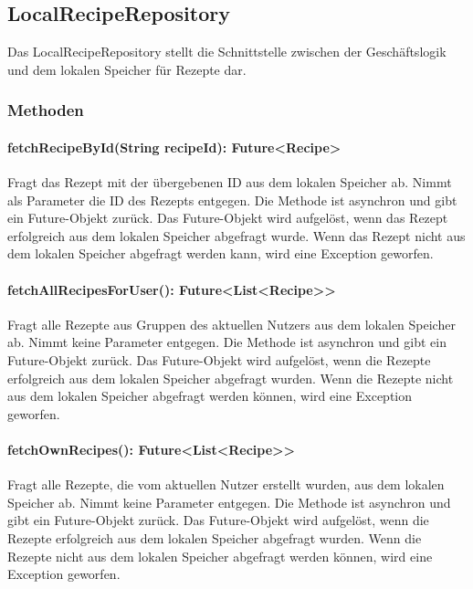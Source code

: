 \documentclass[parskip=full]{scrartcl}
\begin{document}
\subsection{LocalRecipeRepository}
Das LocalRecipeRepository stellt die Schnittstelle zwischen der Geschäftslogik und dem lokalen Speicher für Rezepte dar.
\subsubsection*{Methoden}
\paragraph{fetchRecipeById(String recipeId): Future<Recipe>}
Fragt das Rezept mit der übergebenen ID aus dem lokalen Speicher ab. Nimmt als Parameter die ID des Rezepts entgegen. Die Methode ist asynchron und gibt ein Future-Objekt zurück. Das Future-Objekt wird aufgelöst, wenn das Rezept erfolgreich aus dem lokalen Speicher abgefragt wurde. Wenn das Rezept nicht aus dem lokalen Speicher abgefragt werden kann, wird eine Exception geworfen.
\paragraph{fetchAllRecipesForUser(): Future<List<Recipe>>}
Fragt alle Rezepte aus Gruppen des aktuellen Nutzers aus dem lokalen Speicher ab. Nimmt keine Parameter entgegen. Die Methode ist asynchron und gibt ein Future-Objekt zurück. Das Future-Objekt wird aufgelöst, wenn die Rezepte erfolgreich aus dem lokalen Speicher abgefragt wurden. Wenn die Rezepte nicht aus dem lokalen Speicher abgefragt werden können, wird eine Exception geworfen.
\paragraph{fetchOwnRecipes(): Future<List<Recipe>>}
Fragt alle Rezepte, die vom aktuellen Nutzer erstellt wurden, aus dem lokalen Speicher ab. Nimmt keine Parameter entgegen. Die Methode ist asynchron und gibt ein Future-Objekt zurück. Das Future-Objekt wird aufgelöst, wenn die Rezepte erfolgreich aus dem lokalen Speicher abgefragt wurden. Wenn die Rezepte nicht aus dem lokalen Speicher abgefragt werden können, wird eine Exception geworfen.
\newpage
\end{document}
